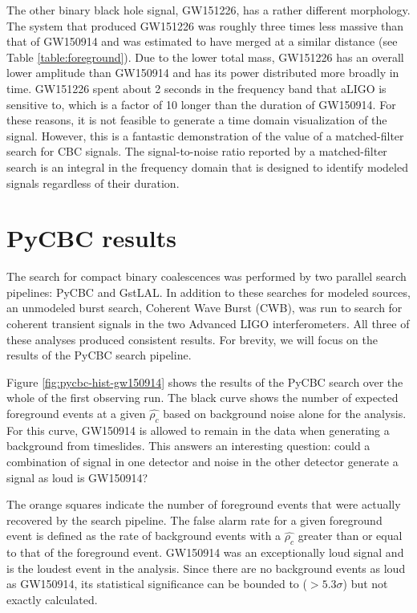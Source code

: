 The other binary black hole signal, GW151226, has a rather different 
morphology. The system that produced GW151226 was roughly three times 
less massive than that of GW150914 and was estimated to have merged 
at a similar distance (see Table \ref{table:foreground}). Due to the 
lower total mass, GW151226 has an overall lower amplitude than GW150914 
and has its power distributed more broadly in time. GW151226 spent about 
2 seconds in the frequency band that aLIGO is sensitive to, which is a 
factor of 10 longer than the duration of GW150914. For these reasons, 
it is not feasible to generate a time domain visualization of the signal. 
However, this is a fantastic demonstration of the value of a 
matched-filter search for CBC signals. The signal-to-noise ratio 
reported by a matched-filter search is an 
integral in the frequency domain that is designed to identify modeled 
signals regardless of their duration.

\section{PyCBC results}

The search for compact binary
coalescences was performed by two parallel search pipelines: PyCBC and 
GstLAL. In addition to these searches for modeled sources, an unmodeled 
burst search, Coherent Wave Burst (CWB), was run to search for coherent 
transient signals in the two Advanced LIGO interferometers. 
All three of these analyses produced consistent results. 
For brevity, we will focus on the results of the PyCBC search pipeline.

Figure \ref{fig:pycbc-hist-gw150914} shows the results of the PyCBC search 
over the whole of the first observing run. The black curve shows the 
number of expected foreground events at a given $\hat{\rho_c}$ based on 
background noise alone for the analysis. For this curve, GW150914 is 
allowed to remain in the data when generating a background from timeslides. 
This answers an interesting question: could a combination of signal in 
one detector and noise in the other detector generate a signal as loud is 
GW150914?

The orange squares indicate the 
number of foreground events that were actually recovered by the search 
pipeline. The false alarm rate for a given foreground 
event is defined as the rate of background events with a $\hat{\rho_c}$ 
greater than or equal to that of the foreground event. GW150914 
was an exceptionally loud signal and is the loudest event in the 
analysis. Since there are no background events as loud as GW150914, 
its statistical significance can be bounded to ($> 5.3\sigma$) 
but not exactly calculated. 

